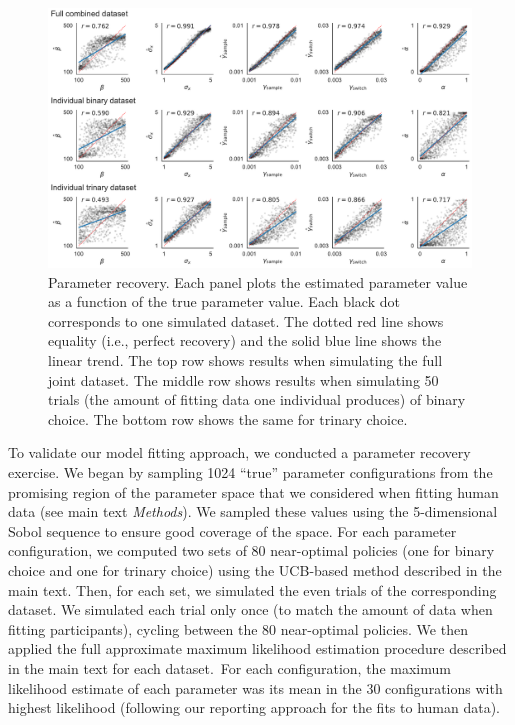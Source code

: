 \begin{figure}[tb!]
  
  \centering
  \includegraphics[width=\textwidth]{figs/attention/supp-recovery.pdf}
  \caption{Parameter recovery. Each panel plots the estimated parameter value as a function of the true parameter value. Each black dot corresponds to one simulated dataset. The dotted red line shows equality (i.e., perfect recovery) and the solid blue line shows the linear trend. The top row shows results when simulating the full joint dataset. The middle row shows results when simulating 50 trials (the amount of fitting data one individual produces) of binary choice. The bottom row shows the same for trinary choice.
  }
  \label{fig:attention-recovery}
  
\end{figure}

To validate our model fitting approach, we conducted a parameter recovery exercise. We began by sampling 1024 ``true'' parameter configurations from the promising region of the parameter space that we considered when fitting human data (see main text \emph{Methods}). We sampled these values using the 5-dimensional Sobol sequence \citep{sobol1967distribution} to ensure good coverage of the space. For each parameter configuration, we computed two sets of 80 near-optimal policies (one for binary choice and one for trinary choice) using the UCB-based method described in the main text. Then, for each set, we simulated the even trials of the corresponding dataset. We simulated each trial only once (to match the amount of data when fitting participants), cycling between the 80 near-optimal policies. We then applied the full approximate maximum likelihood estimation procedure described in the main text for each dataset.\footnotemark\ For each configuration, the maximum likelihood estimate of each parameter was its mean in the 30 configurations with highest likelihood (following our reporting approach for the fits to human data).

